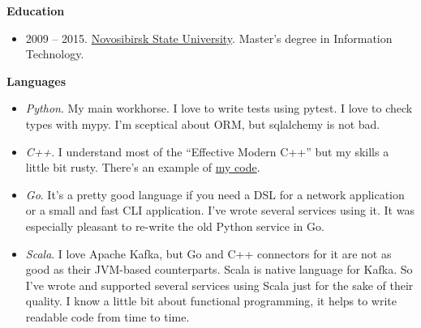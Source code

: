 \documentclass[final]{letter}
\begin{document}
{\bf Education}
\begin{itemize}
  \item 2009 -- 2015. \href{https://www.nsu.ru/n/}{Novosibirsk State University}. Master's degree in Information Technology.
\end{itemize}

{\bf Languages}
\begin{itemize}
\item \textit{Python}. My main workhorse. I love to write tests using pytest. I love to check types with mypy. I'm sceptical about ORM, but sqlalchemy is not bad.
\item \textit{C++}. I understand most of the ``Effective Modern C++'' but my skills a little bit rusty. There's an example of \href{https://github.com/neexee/review}{my code}.
\item \textit{Go}. It's a pretty good language if you need a DSL for a network application or a small and fast CLI application. I've wrote several services using it. It was especially pleasant to re-write the old Python service in Go.
\item \textit{Scala}. I love Apache Kafka, but Go and C++ connectors for it are not as good as their JVM-based counterparts. Scala is native language for Kafka. So I've wrote and supported several services using Scala just for the sake of their quality. I know a little bit about functional programming, it helps to write readable code from time to time.
\end{itemize}
\end{document}
